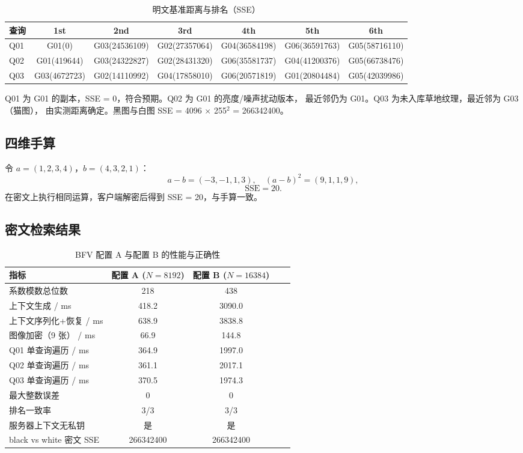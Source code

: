 \documentclass{SYSUReport}
\begin{document}
\begin{table}[htbp]
\centering
\caption{明文基准距离与排名（SSE）}
\begin{tabular}{lcccccc}
\toprule
查询 & 1st & 2nd & 3rd & 4th & 5th & 6th \\
\midrule
Q01 & G01(0) & G03(24536109) & G02(27357064) & G04(36584198) & G06(36591763) & G05(58716110) \\
Q02 & G01(419644) & G03(24322827) & G02(28431320) & G06(35581737) & G04(41200376) & G05(66738476) \\
Q03 & G03(4672723) & G02(14110992) & G04(17858010) & G06(20571819) & G01(20804484) & G05(42039986) \\
\bottomrule
\end{tabular}
\end{table}

Q01 为 G01 的副本，SSE = 0，符合预期。Q02 为 G01 的亮度/噪声扰动版本，
最近邻仍为 G01。Q03 为未入库草地纹理，最近邻为 G03（猫图），
由实测距离确定。黑图与白图 SSE = 4096 $\times$ 255$^2$ = 266342400。

\subsection{四维手算}
令 $a = (1,2,3,4)$，$b = (4,3,2,1)$：
$$a - b = (-3,-1,1,3), \quad (a-b)^2 = (9,1,1,9),$$
$$\mathrm{SSE} = 20.$$
在密文上执行相同运算，客户端解密后得到 SSE = 20，与手算一致。

\subsection{密文检索结果}

\begin{table}[htbp]
\centering
\caption{BFV 配置 A 与配置 B 的性能与正确性}
\begin{tabular}{lcccc}
\toprule
指标 & 配置 A ($N=8192$) & 配置 B ($N=16384$) \\
\midrule
系数模数总位数 & 218 & 438 \\
上下文生成 / ms & 418.2 & 3090.0 \\
上下文序列化+恢复 / ms & 638.9 & 3838.8 \\
图像加密（9 张） / ms & 66.9 & 144.8 \\
Q01 单查询遍历 / ms & 364.9 & 1997.0 \\
Q02 单查询遍历 / ms & 361.1 & 2017.1 \\
Q03 单查询遍历 / ms & 370.5 & 1974.3 \\
最大整数误差 & 0 & 0 \\
排名一致率 & 3/3 & 3/3 \\
服务器上下文无私钥 & 是 & 是 \\
black vs white 密文 SSE & 266342400 & 266342400 \\
\bottomrule
\end{tabular}
\end{table}
\end{document}

